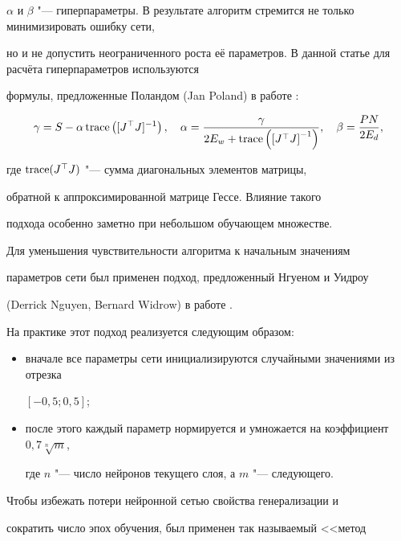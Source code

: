$\alpha $ и $\beta $ "--- гиперпараметры. В результате алгоритм стремится не только  минимизировать ошибку сети,

но и не допустить неограниченного роста её параметров. В данной статье для расчёта гиперпараметров используются

формулы, предложенные Поландом (Jan Poland) в работе \cite{afertsev:Poland}:

\[

\gamma =S -\alpha \,{\rm trace} \left([J^\top J]^{-1}\right),

\quad 

\alpha  =\frac{\gamma }{2 E_w  + {\rm trace} \left(\left[J^\top J\right]^{ -1} \right)}, 

\quad

\beta = \frac{P N}{2 E_d},

\]

где ${\rm trace}(J^\top J)$ "--- сумма диагональных элементов матрицы,

обратной к аппроксимированной матрице Гессе. Влияние такого

подхода особенно заметно при небольшом обучающем множестве.



Для уменьшения чувствительности алгоритма к начальным значениям

параметров сети был применен подход, предложенный Нгуеном и Уидроу

(Derrick Nguyen, Bernard Widrow) в работе \cite{afertsev:Nguyen}.

На практике этот подход реализуется следующим образом:



\begin{itemize}

  \item вначале все параметры сети инициализируются случайными значениями из отрезка

  $[-0,5;0,5]$;

  \item после этого каждый параметр нормируется и умножается на коэффициент $0,7 \sqrt[n]{m}$,

  где $n$ "--- число нейронов текущего слоя, а $m$ "--- следующего.

\end{itemize}



Чтобы избежать потери нейронной сетью свойства генерализации и

сократить число эпох обучения, был применен так называемый <<метод

